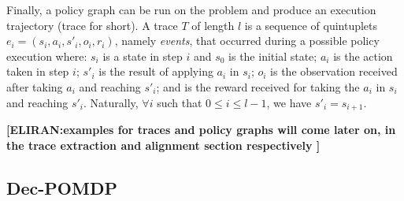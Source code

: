 \documentclass[letterpaper]{article} %
\newcommand{\eliran}[1]{\textbf{[\color{red}ELIRAN:#1]}}
\begin{document}
Finally, a policy graph can be run on the problem and produce an execution trajectory (trace for short). A trace $T$ of length $l$ is a sequence of quintuplets $e_i = (s_i, a_i, s'_i, o_i, r_i)$, namely \emph{events}, that occurred during a possible policy execution where: $s_i$ is a state in step $i$ and $s_0$ is the initial state;
$a_i$ is the action taken in step $i$;
    $s'_i$ is the result of applying $a_i$ in $s_i$;
    $o_i$ is the observation received after taking $a_i$ and reaching $s'_i$; and is the reward received for taking the $a_i$ in $s_i$ and reaching $s'_i$. Naturally, $\forall i$ such
    that $0\leq i \leq l-1$, we have $s'_i=s_{i+1}$.

\eliran{examples for traces and policy graphs will come later on, in the trace extraction and alignment section respectively
}

\subsection{Dec-POMDP}
\end{document}
